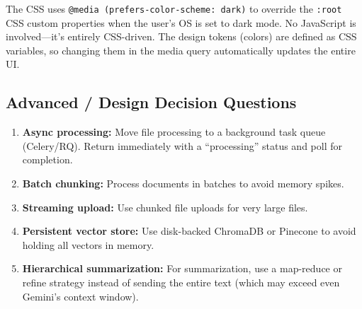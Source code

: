 \documentclass[12pt,a4paper]{article}
\begin{document}
\begin{interviewbox}
\end{interviewbox}
\begin{answerbox}
The CSS uses \texttt{@media (prefers-color-scheme: dark)} to override the \texttt{:root} CSS custom properties when the user's OS is set to dark mode. No JavaScript is involved—it's entirely CSS-driven. The design tokens (colors) are defined as CSS variables, so changing them in the media query automatically updates the entire UI.
\end{answerbox}

\subsection{Advanced / Design Decision Questions}

\begin{interviewbox}
\end{interviewbox}
\begin{answerbox}
\begin{enumerate}
  \item \textbf{Async processing:} Move file processing to a background task queue (Celery/RQ). Return immediately with a ``processing'' status and poll for completion.
  \item \textbf{Batch chunking:} Process documents in batches to avoid memory spikes.
  \item \textbf{Streaming upload:} Use chunked file uploads for very large files.
  \item \textbf{Persistent vector store:} Use disk-backed ChromaDB or Pinecone to avoid holding all vectors in memory.
  \item \textbf{Hierarchical summarization:} For summarization, use a map-reduce or refine strategy instead of sending the entire text (which may exceed even Gemini's context window).
\end{enumerate}
\end{answerbox}
\end{document}
